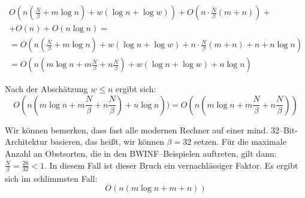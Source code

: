 \begin{equation*}
\begin{gathered}
O(n (\frac{N}{\beta} + m \log n) + w (\log n + \log w)) +
 O(n\cdot \frac{N}{\beta}(m + n)) + \\
+ O(n) + O(n \log n) =\\
= O(n (\frac{N}{\beta} + m \log n) + w (\log n + \log w) + n\cdot \frac{N}{\beta}(m + n)+ n + n \log n)\\
= O(n (m \log n + m \frac{N}{\beta} + n \frac{N}{\beta})  + w (\log n + \log w) + n \log n)
\end{gathered}
\end{equation*}

Nach der Abschätzung $w \leqslant n$ ergibt sich:
\[
O(n (m \log n + m \frac{N}{\beta} + n \frac{N}{\beta})  + n \log n)) =
O(n (m \log n + m \frac{N}{\beta} + n \frac{N}{\beta}))
\]

\noindent 
Wir können bemerken, dass fast alle modernen Rechner auf einer
mind. 32--Bit-Architektur basieren, das heißt, wir können $\beta = 32$ setzen.
Für die maximale Anzahl an Obstsorten, die in den BWINF--Beispielen auftreten, gilt
dann: $\frac{N}{\beta} = \frac{26}{32} < 1$.
In diesem Fall ist dieser Bruch ein vernachlässiger Faktor. Es ergibt sich im schlimmsten Fall:
\[
O(n (m \log n + m + n))
\]
